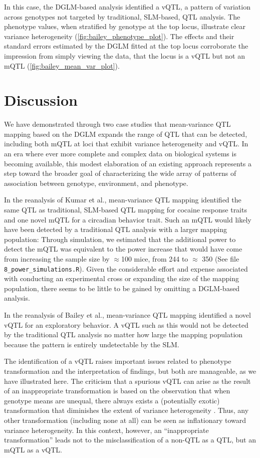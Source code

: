     In this case, the DGLM-based analysis identified a vQTL, a pattern of variation across genotypes not targeted by traditional, SLM-based, QTL analysis.
    The phenotype values, when stratified by genotype at the top locus, illustrate clear variance heterogeneity (\autoref{fig:bailey_phenotype_plot}).
    The effects and their standard errors estimated by the DGLM fitted at the top locus corroborate the impression from simply viewing the data, that the locus is a vQTL but not an mQTL (\autoref{fig:bailey_mean_var_plot}).


\section{Discussion}
    We have demonstrated through two case studies that mean-variance QTL mapping based on the DGLM expands the range of QTL that can be detected, including both mQTL at loci that exhibit variance heterogeneity and vQTL.
    In an era where ever more complete and complex data on biological systems is becoming available, this modest elaboration of an existing approach represents a step toward the broader goal of characterizing the wide array of patterns of association between genotype, environment, and phenotype.

    In the reanalysis of Kumar et al., mean-variance QTL mapping identified the same QTL as traditional, SLM-based QTL mapping for cocaine response traits and one novel mQTL for a circadian behavior trait.
    Such an mQTL would likely have been detected by a traditional QTL analysis with a larger mapping population:
    Through simulation, we estimated that the additional power to detect the mQTL was equivalent to the power increase that would have come from increasing the sample size by $\approx$100 mice, from 244 to $\approx$ 350 (See file \texttt{8\_power\_simulations.R}).
    Given the considerable effort and expense associated with conducting an experimental cross or expanding the size of the mapping population, there seems to be little to be gained by omitting a DGLM-based analysis.

    In the reanalysis of Bailey et al., mean-variance QTL mapping identified a novel vQTL for an exploratory behavior.
    A vQTL such as this would not be detected by the traditional QTL analysis no matter how large the mapping population because the pattern is entirely undetectable by the SLM.
    
    The identification of a vQTL raises important issues related to phenotype transformation and the interpretation of findings, but both are manageable, as we have illustrated here.
    The criticism that a spurious vQTL can arise as the result of an inappropriate transformation is based on the observation that when genotype means are unequal, there always exists a (potentially exotic) transformation that diminishes the extent of variance heterogeneity \citep{Sun2013a}.
    Thus, any other transformation (including none at all) can be seen as inflationary toward variance heterogeneity.
    In this context, however, an ``inappropriate transformation'' leads not to the misclassification of a non-QTL as a QTL, but an mQTL as a vQTL.


